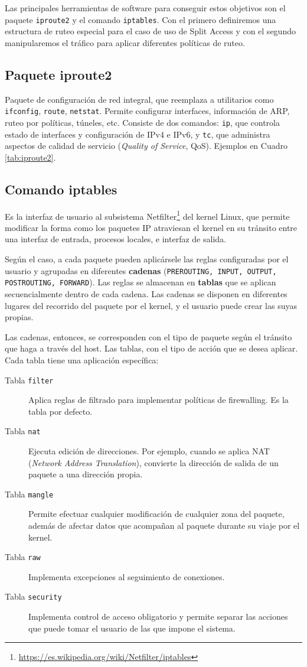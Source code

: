 Las principales herramientas de software para conseguir estos objetivos son el paquete \texttt{iproute2} y el comando \texttt{iptables}. Con el primero definiremos una estructura de ruteo especial para el caso de uso de Split Access y con el segundo manipularemos el tráfico para aplicar diferentes políticas de ruteo.

\subsection{Paquete iproute2}
Paquete de configuración de red integral, que reemplaza a utilitarios como \texttt{ifconfig}, \texttt{route}, \texttt{netstat}. Permite configurar interfaces, información de ARP, ruteo por políticas, túneles, etc. Consiste de dos comandos: \texttt{ip}, que controla estado de interfaces y configuración de IPv4 e IPv6, y \texttt{tc}, que administra aspectos de calidad de servicio (\textit{Quality of Service}, QoS). Ejemplos en Cuadro \ref{tab:iproute2}.

\subsection{Comando iptables}
Es la interfaz de usuario al subsistema Netfilter\footnote{\url{https://es.wikipedia.org/wiki/Netfilter/iptables}} del kernel Linux, que permite modificar la forma como los paquetes IP atraviesan el kernel en su tránsito entre una interfaz de entrada, procesos locales, e interfaz de salida. 

Según el caso, a cada paquete pueden aplicársele las reglas configuradas por el usuario y agrupadas en diferentes \textbf{cadenas} (\texttt{PREROUTING, INPUT, OUTPUT, POSTROUTING, FORWARD}). Las reglas se almacenan en \textbf{tablas} que se aplican secuencialmente dentro de cada cadena. Las cadenas se disponen en diferentes lugares del recorrido del paquete por el kernel, y el usuario puede crear las suyas propias. 


Las cadenas, entonces, se corresponden con el tipo de paquete según el tránsito que haga a través del host. Las tablas, con el tipo de acción que se desea aplicar. Cada tabla tiene una aplicación específica:

\begin{description}
	\item[Tabla \texttt{filter}] Aplica reglas de filtrado para implementar políticas de firewalling. Es la tabla por defecto.
	\item[Tabla \texttt{nat}] Ejecuta edición de direcciones. Por ejemplo, cuando se aplica NAT (\textit{Network Address Translation}), convierte la dirección de salida de un paquete a una dirección propia.
	\item[Tabla \texttt{mangle}] Permite efectuar cualquier modificación de cualquier zona del paquete, además de afectar datos que acompañan al paquete durante su viaje por el kernel. 
	\item[Tabla \texttt{raw}] Implementa excepciones al seguimiento de conexiones.
	\item[Tabla \texttt{security}] Implementa control de acceso obligatorio y permite separar las acciones que puede tomar el usuario de las que impone el sistema.
\end{description}

